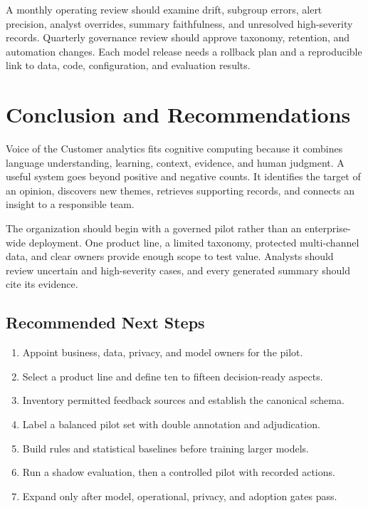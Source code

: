 \documentclass[11pt,a4paper,twoside]{article}
\begin{document}
A monthly operating review should examine drift, subgroup errors, alert precision, analyst overrides, summary faithfulness, and unresolved high-severity records. Quarterly governance review should approve taxonomy, retention, and automation changes. Each model release needs a rollback plan and a reproducible link to data, code, configuration, and evaluation results.

\newpage

\section{Conclusion and Recommendations}

Voice of the Customer analytics fits cognitive computing because it combines language understanding, learning, context, evidence, and human judgment. A useful system goes beyond positive and negative counts. It identifies the target of an opinion, discovers new themes, retrieves supporting records, and connects an insight to a responsible team.

The organization should begin with a governed pilot rather than an enterprise-wide deployment. One product line, a limited taxonomy, protected multi-channel data, and clear owners provide enough scope to test value. Analysts should review uncertain and high-severity cases, and every generated summary should cite its evidence.

\subsection{Recommended Next Steps}

\begin{enumerate}
  \item Appoint business, data, privacy, and model owners for the pilot.
  \item Select a product line and define ten to fifteen decision-ready aspects.
  \item Inventory permitted feedback sources and establish the canonical schema.
  \item Label a balanced pilot set with double annotation and adjudication.
  \item Build rules and statistical baselines before training larger models.
  \item Run a shadow evaluation, then a controlled pilot with recorded actions.
  \item Expand only after model, operational, privacy, and adoption gates pass.
\end{enumerate}
\end{document}

